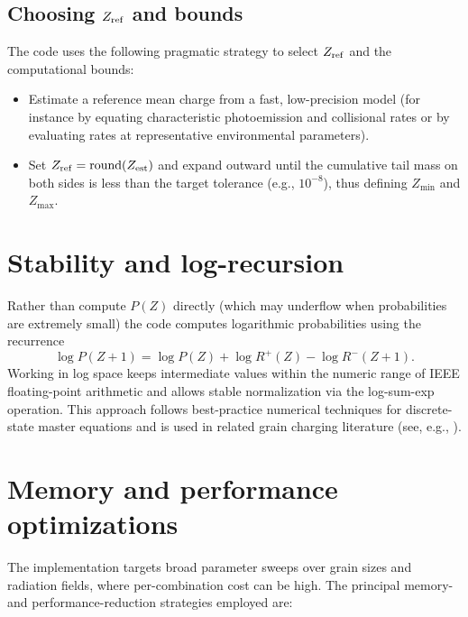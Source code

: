 \documentclass{article}
\begin{document}
\subsection*{Choosing $Z_{\rm ref}$ and bounds}
The code uses the following pragmatic strategy to select $Z_{\rm ref}$ and the
computational bounds:
\begin{itemize}
  \item Estimate a reference mean charge from a fast, low-precision model
    (for instance by equating characteristic photoemission and collisional
    rates or by evaluating rates at representative environmental parameters).
  \item Set $Z_{\rm ref}=\mathrm{round}(Z_{\rm est})$ and expand outward
    until the cumulative tail mass on both sides is less than the target
    tolerance (e.g., $10^{-8}$), thus defining $Z_{\min}$ and $Z_{\max}$.
\end{itemize}

\section{Stability and log-recursion}
Rather than compute $P(Z)$ directly (which may underflow when probabilities
are extremely small) the code computes logarithmic probabilities using the
recurrence
\begin{equation*}
  \log P(Z+1) = \log P(Z) + \log R^{+}(Z) - \log R^{-}(Z+1).
\end{equation*}
Working in log space keeps intermediate values within the numeric range of
IEEE floating-point arithmetic and allows stable normalization via the
log-sum-exp operation. This approach follows best-practice numerical
techniques for discrete-state master equations and is used in related grain
charging literature (see, e.g., \cite{Weingartner2001}).

\section{Memory and performance optimizations}
The implementation targets broad parameter sweeps over grain sizes and
radiation fields, where per-combination cost can be high. The principal
memory- and performance-reduction strategies employed are:
\end{document}
